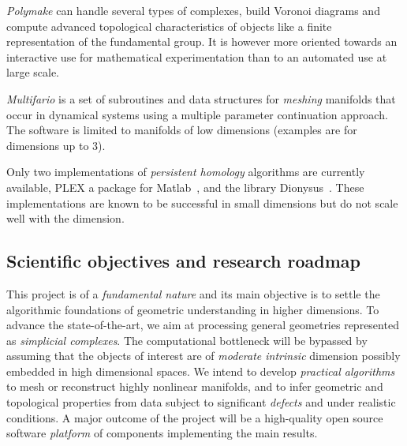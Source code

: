  {\em Polymake} can handle several types of complexes, build Voronoi diagrams and compute advanced topological characteristics of objects like a finite representation of the fundamental group. It is however more oriented towards an interactive use for mathematical experimentation 
than to an automated use at large scale.%

{\em Multifario} is a set of subroutines and data structures for {\em meshing} manifolds that occur in dynamical systems using a multiple parameter continuation approach. The software is limited to manifolds of low dimensions (examples are for dimensions up to 3). 

Only two implementations of {\em persistent homology} algorithms are currently available, PLEX a package for Matlab~\cite{}, and  the library Dionysus~\cite{}. These implementations are known to be successful in small dimensions but do not scale well with the dimension. %

\subsection{Scientific objectives and research roadmap} 

This project is of a {\em fundamental nature} and its main objective is to settle the algorithmic foundations of geometric understanding in higher dimensions. To advance the state-of-the-art, we aim at processing general geometries represented as {\em simplicial complexes}. The computational bottleneck will be bypassed by assuming that the objects of interest are of {\em moderate intrinsic} dimension possibly embedded in high dimensional spaces. We intend to develop {\em practical algorithms} to mesh or reconstruct highly nonlinear manifolds, and to infer geometric and topological properties from data subject to significant {\em defects} and
 under realistic conditions. A major outcome of the project will be a high-quality open source software {\em platform} of components implementing the main results.

